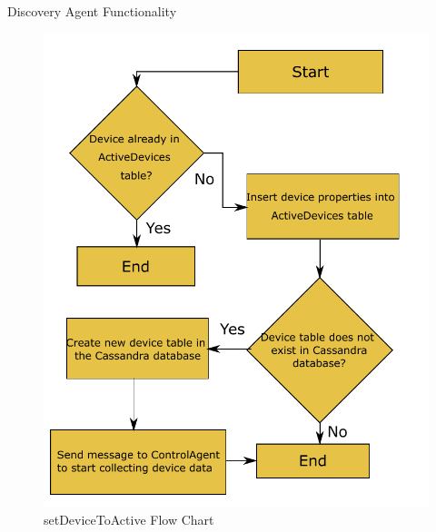 \documentclass{beamer}
\begin{document}
\begin{frame}{Discovery Agent Functionality}{}
    \begin{figure}
        \centering
        \includegraphics[scale=0.4]{figs/agents/setDeviceToActiveFlow.pdf}
        \caption{setDeviceToActive Flow Chart}
        \label{fig:setDeviceToActive}
    \end{figure}
\end{frame}
\end{document}
